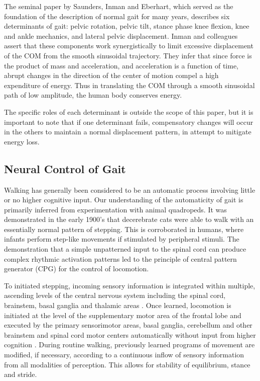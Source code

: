 \documentclass[11pt, oneside]{report}
\begin{document}
The seminal paper by Saunders, Inman and Eberhart, which served as the foundation of the description of normal gait for many years, describes six determinants of gait: pelvic rotation, pelvic tilt, stance phase knee flexion, knee and ankle mechanics, and lateral pelvic displacement\cite{SaundersJBInmanVT1953}. Inman and colleagues assert that these components work synergistically to limit excessive displacement of the COM from the smooth sinusoidal trajectory\cite{SaundersJBInmanVT1953}. They infer that since force is the product of mass and acceleration, and acceleration is a function of time, abrupt changes in the direction of the center of motion compel a high expenditure of energy\cite{SaundersJBInmanVT1953}. Thus in translating the COM through a smooth sinusoidal path of low amplitude, the human body conserves energy\cite{SaundersJBInmanVT1953}.

The specific roles of each determinant is outside the scope of this paper, but it is important to note that if one determinant fails, compensatory changes will occur in the others to maintain a normal displacement pattern, in attempt to mitigate energy loss\cite{SaundersJBInmanVT1953}. 

\subsection{Neural Control of Gait}

Walking has generally been considered to be an automatic process involving little or no higher cognitive input\cite{Shik1976}. Our understanding of the automaticity of gait is primarily inferred from experimentation with animal quadropeds. It was demonstrated in the early 1900's that decerebrate cats were able to walk with an essentially normal pattern of stepping\cite{Sherrington1910}. This is corroborated in humans, where infants perform step-like movements if stimulated by peripheral stimuli\cite{Dietz1997}. The demonstration that a simple unpatterned input to the spinal cord can produce complex rhythmic activation patterns led to the principle of central pattern generator (CPG) for the control of locomotion\cite{Mackay-lyons2002}. 

To initiated stepping, incoming sensory information is integrated within multiple, ascending levels of the central nervous system including the spinal cord, brainstem, basal ganglia and thalamic areas \cite{Shik1976, Dietz1997}. Once learned, locomotion is initiated at the level of the supplementary motor area of the frontal lobe and executed by the primary sensorimotor areas, basal ganglia, cerebellum and other brainstem and spinal cord motor centers automatically without input from higher cognition \cite{Shik1976, Dietz1997}. During routine walking, previously learned programs of movement are modified, if necessary, according to a continuous inflow of sensory information from all modalities of perception. This allows for stability of equilibrium, stance and stride\cite{Sheridan2007}. 
\end{document}

